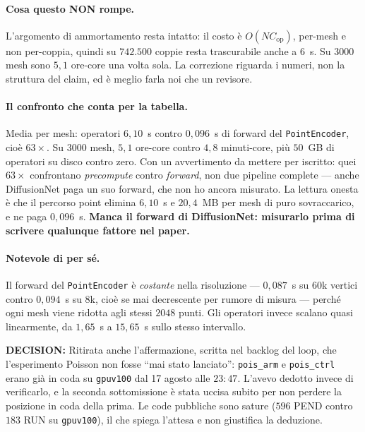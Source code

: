 \documentclass[11pt,a4paper]{article}
\newcommand{\decision}[1]{\textcolor{decision}{\textbf{DECISION:}} #1}
\begin{document}
\paragraph{Cosa questo NON rompe.} L'argomento di ammortamento resta intatto: il costo \`e
$O(N C_{\mathrm{op}})$, per-mesh e non per-coppia, quindi su $742{.}500$ coppie resta
trascurabile anche a $6$~s. Su $3000$ mesh sono $5{,}1$ ore-core una volta sola. La correzione
riguarda i numeri, non la struttura del claim, ed \`e meglio farla noi che un revisore.

\paragraph{Il confronto che conta per la tabella.} Media per mesh: operatori $6{,}10$~s contro
$0{,}096$~s di forward del \texttt{PointEncoder}, cio\`e $63\times$. Su $3000$ mesh, $5{,}1$
ore-core contro $4{,}8$ minuti-core, pi\`u $50$~GB di operatori su disco contro zero. Con un
avvertimento da mettere per iscritto: quei $63\times$ confrontano \emph{precompute} contro
\emph{forward}, non due pipeline complete --- anche DiffusionNet paga un suo forward, che non ho
ancora misurato. La lettura onesta \`e che il percorso point elimina $6{,}10$~s e $20{,}4$~MB per
mesh di puro sovraccarico, e ne paga $0{,}096$~s. \textbf{Manca il forward di DiffusionNet:
misurarlo prima di scrivere qualunque fattore nel paper.}

\paragraph{Notevole di per s\'e.} Il forward del \texttt{PointEncoder} \`e \emph{costante} nella
risoluzione --- $0{,}087$~s su $60$k vertici contro $0{,}094$~s su $8$k, cio\`e se mai
decrescente per rumore di misura --- perch\'e ogni mesh viene ridotta agli stessi $2048$ punti.
Gli operatori invece scalano quasi linearmente, da $1{,}65$~s a $15{,}65$~s sullo stesso
intervallo.

\decision{Ritirata anche l'affermazione, scritta nel backlog del loop, che l'esperimento Poisson
non fosse ``mai stato lanciato'': \texttt{pois\_arm} e \texttt{pois\_ctrl} erano gi\`a in coda
su \texttt{gpuv100} dal 17 agosto alle $23{:}47$. L'avevo dedotto invece di verificarlo, e la
seconda sottomissione \`e stata uccisa subito per non perdere la posizione in coda della prima.
Le code pubbliche sono sature ($596$ PEND contro $183$ RUN su \texttt{gpuv100}), il che spiega
l'attesa e non giustifica la deduzione.}
\end{document}
